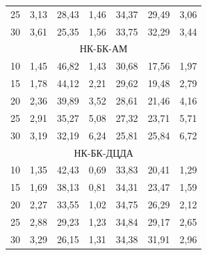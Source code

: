\begin{table}[p!]
\begin{tabular}{c|c|c|c|c|c|c}
25             & 3,13  & 28,43    & 1,46    & 34,37   & 29,49& 3,06 \\ 

30             & 3,61  & 25,35    & 1,56    & 33,75   & 32,29& 3,44 \\ \hline

\multicolumn{7}{c}{\rule{0mm}{14pt}НК-БК-АМ} \\

\hline

\rule{0mm}{14pt}%

10              & 1,45      & 46,82    & 1,43    & 30,68   & 17,56& 1,97 \\ 

15              & 1,78      & 44,12    & 2,21    & 29,62   & 19,48& 2,79 \\ 

20              & 2,36      & 39,89    & 3,52    & 28,61   & 21,46& 4,16 \\ 

25              & 2,91      & 35,27    & 5,08    & 27,32   & 23,71& 5,71 \\ 

30              & 3,19      & 32,19    & 6,24    & 25,81   & 25,84& 6,72 \\ \hline

\multicolumn{7}{c}{\rule{0mm}{14pt}НК-БК-ДЦДА} \\

\hline

\rule{0mm}{14pt}%

10              & 1,35      & 42,43    & 0,69    & 33,83   & 20,41& 1,29 \\ 

15              & 1,69      & 38,13    & 0,81    & 34,31   & 23,47& 1,59 \\ 

20              & 2,27      & 33,55    & 1,02    & 34,75   & 26,29& 2,12 \\ 

25              & 2,88      & 29,23    & 1,23    & 34,84   & 29,17& 2,65 \\ 

30              & 3,29      & 26,15    & 1,31    & 34,38   & 31,91& 2,96 \\ \hline

\end{tabular}



\end{table}







